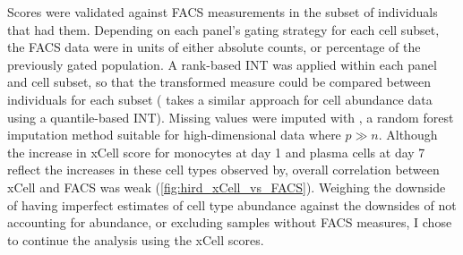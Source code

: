 Scores were validated against \gls{FACS} measurements in the subset of individuals that had them.
Depending on each panel's gating strategy for each cell subset, the \gls{FACS} data were in units of either absolute counts, or percentage of the previously gated population.
A rank-based \gls{INT} was applied within each panel and cell subset, so that the transformed measure could be compared between individuals for each subset (\autocite{astle2016AllelicLandscapeHuman} takes a similar approach for cell abundance data using a quantile-based \gls{INT}).
%
Missing values were imputed with , a random forest imputation method suitable for high-dimensional data where $p \gg n$.
Although the increase in xCell score for monocytes at day 1 and plasma cells at day 7 reflect the increases in these cell types observed by\autocite{sobolev2016AdjuvantedInfluenzaH1N1Vaccination}, overall correlation between xCell and \gls{FACS} was weak (\autoref{fig:hird_xCell_vs_FACS}).
Weighing the downside of having imperfect estimates of cell type abundance against the downsides of not accounting for abundance, or excluding samples without \gls{FACS} measures, I chose to continue the analysis using the xCell scores.


